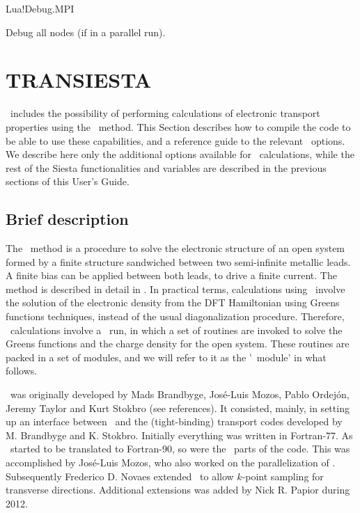 \begin{fdflogicalF}{Lua!Debug.MPI}

  Debug all nodes (if in a parallel run).
  
\end{fdflogicalF}


\section{TRANSIESTA}

\siesta\ includes the possibility of performing calculations of
electronic transport properties using the \tsiesta\ method. This
Section describes how to compile the code to be able to use these
capabilities, and a reference guide to the relevant \fdflib\
options. We describe here only the additional options available for
\tsiesta\ calculations, while the rest of the Siesta functionalities
and variables are described in the previous sections of this User's
Guide.

\subsection{Brief description}

The \tsiesta\ method is a procedure to solve the electronic
structure of an open system formed by a finite structure sandwiched
between two semi-infinite metallic leads. A finite bias can be applied
between both leads, to drive a finite current. The method is described
in detail in \cite{Brandbyge2002}. In practical terms,
calculations using \tsiesta\ involve the solution of the
electronic density from the DFT Hamiltonian using Greens functions
techniques, instead of the usual diagonalization procedure. Therefore,
\tsiesta\ calculations involve a \siesta\ run, in which a
set of routines are invoked to solve the Greens functions and the
charge density for the open system. These routines are packed in a set
of modules, and we will refer to it as the '\tsiesta\ module'
in what follows.

\tsiesta\ was originally developed by Mads Brandbyge,
Jos\'e-Luis Mozos, Pablo Ordej\'on, Jeremy Taylor and Kurt Stokbro
(see references). It consisted, mainly, in setting up an interface
between \siesta\ and the (tight-binding) transport codes developed
by M. Brandbyge and K. Stokbro. Initially everything was written in
Fortran-77. As \siesta\ started to be translated to Fortran-90, so
were the \tsiesta\ parts of the code. This was accomplished by
Jos\'e-Luis Mozos, who also worked on the parallelization of
\tsiesta. 
%
Subsequently Frederico D. Novaes extended \tsiesta\ to allow $k$-point
sampling for transverse directions. Additional extensions was
added by Nick R. Papior during 2012.


